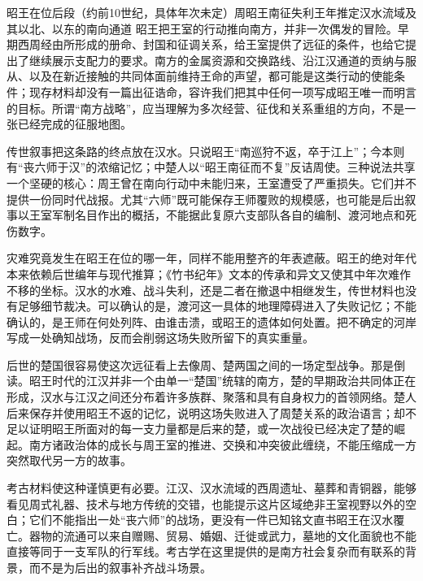 \begin{event}{昭王在位后段（约前10世纪，具体年次未定）}{周昭王南征失利}{王年推定}{汉水流域及其以北、以东的南向通道}
昭王把王室的行动推向南方，并非一次偶发的冒险。早期西周经由所形成的册命、封国和征调关系，给王室提供了远征的条件，也给它提出了继续展示支配力的要求。南方的金属资源和交换路线、沿江汉通道的贡纳与服从、以及在新近接触的共同体面前维持王命的声望，都可能是这类行动的使能条件；现存材料却没有一篇出征诰命，容许我们把其中任何一项写成昭王唯一而明言的目标。所谓“南方战略”，应当理解为多次经营、征伐和关系重组的方向，不是一张已经完成的征服地图。

传世叙事把这条路的终点放在汉水。只说昭王“南巡狩不返，卒于江上”；今本则有“丧六师于汉”的浓缩记忆；中楚人以“昭王南征而不复”反诘周使。三种说法共享一个坚硬的核心：周王曾在南向行动中未能归来，王室遭受了严重损失。它们并不提供一份同时代战报。尤其“六师”既可能保存王师覆败的规模感，也可能是后出叙事以王室军制名目作出的概括，不能据此复原六支部队各自的编制、渡河地点和死伤数字。

灾难究竟发生在昭王在位的哪一年，同样不能用整齐的年表遮蔽。昭王的绝对年代本来依赖后世编年与现代推算；《竹书纪年》文本的传承和异文又使其中年次难作不移的坐标。汉水的水难、战斗失利，还是二者在撤退中相继发生，传世材料也没有足够细节裁决。可以确认的是，渡河这一具体的地理障碍进入了失败记忆；不能确认的，是王师在何处列阵、由谁击溃，或昭王的遗体如何处置。把不确定的河岸写成一处确知战场，反而会削弱这场失败所留下的真实重量。

后世的楚国很容易使这次远征看上去像周、楚两国之间的一场定型战争。那是倒读。昭王时代的江汉并非一个由单一“楚国”统辖的南方，楚的早期政治共同体正在形成，汉水与江汉之间还分布着许多族群、聚落和具有自身权力的首领网络。楚人后来保存并使用昭王不返的记忆，说明这场失败进入了周楚关系的政治语言；却不足以证明昭王所面对的每一支力量都是后来的楚，或一次战役已经决定了楚的崛起。南方诸政治体的成长与周王室的推进、交换和冲突彼此缠绕，不能压缩成一方突然取代另一方的故事。

考古材料使这种谨慎更有必要。江汉、汉水流域的西周遗址、墓葬和青铜器，能够看见周式礼器、技术与地方传统的交错，也能提示这片区域绝非王室视野以外的空白；它们不能指出一处“丧六师”的战场，更没有一件已知铭文直书昭王在汉水覆亡。器物的流通可以来自赠赐、贸易、婚姻、迁徙或武力，墓地的文化面貌也不能直接等同于一支军队的行军线。考古学在这里提供的是南方社会复杂而有联系的背景，而不是为后出的叙事补齐战斗场景。


\end{event}
